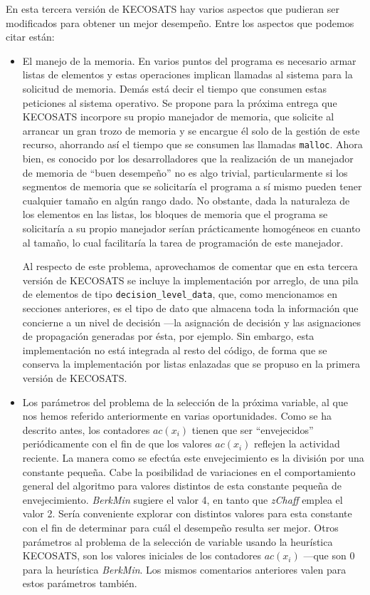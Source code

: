 \documentclass[12pt,lettersize,oneside]{article}
\begin{document}
En esta tercera versión de KECOSATS hay varios aspectos que pudieran ser
modificados para obtener un mejor desempeño. Entre los aspectos que podemos
citar están:
\begin{itemize}
\item El manejo de la memoria. En varios puntos del programa es necesario armar
  listas de elementos y estas operaciones implican llamadas al sistema para la
  solicitud de memoria. Demás está decir el tiempo que consumen estas peticiones
  al sistema operativo. Se propone para la próxima entrega que KECOSATS
  incorpore su propio manejador de memoria, que solicite al arrancar un gran
  trozo de memoria y se encargue él solo de la gestión de este recurso,
  ahorrando así el tiempo que se consumen las llamadas {\tt malloc}. Ahora bien,
  es conocido por los desarrolladores que la realización de un manejador de
  memoria de ``buen desempeño'' no es algo trivial, particularmente si los
  segmentos de memoria que se solicitaría el programa a sí mismo pueden tener
  cualquier tamaño en algún rango dado. No obstante, dada la naturaleza de los
  elementos en las listas, los bloques de memoria que el programa se solicitaría
  a su propio manejador serían prácticamente homogéneos en cuanto al tamaño, lo
  cual facilitaría la tarea de programación de este manejador.

  Al respecto de este problema, aprovechamos de comentar que en esta tercera
  versión de KECOSATS se incluye la implementación por arreglo, de una pila de
  elementos de tipo {\tt decision\_level\_data}, que, como mencionamos en
  secciones anteriores, es el tipo de dato que almacena toda la información que
  concierne a un nivel de decisión ---la asignación de decisión y las
  asignaciones de propagación generadas por ésta, por ejemplo. Sin embargo, esta
  implementación no está integrada al resto del código, de forma que se conserva
  la implementación por listas enlazadas que se propuso en la primera versión de
  KECOSATS.

\item Los parámetros del problema de la selección de la próxima variable, al que
  nos hemos referido anteriormente en varias oportunidades. Como se ha descrito
  antes, los contadores $ac(x_i)$ tienen que ser ``envejecidos'' periódicamente
  con el fin de que los valores $ac(x_i)$ reflejen la actividad reciente. La
  manera como se efectúa este envejecimiento es la división por una constante
  pequeña. Cabe la posibilidad de variaciones en el comportamiento general del
  algoritmo para valores distintos de esta constante pequeña de
  envejecimiento. \emph{BerkMin} sugiere el valor 4, en tanto que \emph{zChaff}
  emplea el valor 2. Sería conveniente explorar con distintos valores para esta
  constante con el fin de determinar para cuál el desempeño resulta ser mejor.
  Otros parámetros al problema de la selección de variable usando la heurística
  KECOSATS, son los valores iniciales de los contadores $ac(x_i)$ ---que son 0
  para la heurística \emph{BerkMin}. Los mismos comentarios anteriores valen
  para estos parámetros también.


\end{itemize}
\end{document}

